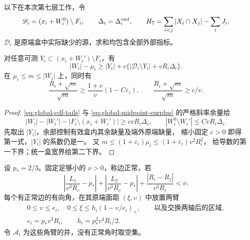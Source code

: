 以下在本次第七层工作，令
\[
 \mathscr D_i=(x_i+W_i^0)\setminus F_i,\qquad
 \Delta_i=\Delta_i^{\rm end},\qquad
 H_7=\sum_{i<j}|X_i\cap X_j|-\sum_iJ_i.
\]
\(\mathscr D_i\) 是原端盒中实际缺少的源，求和均包含全部外部指标。

\begin{lemma}[系数一及正剩余]\label{planar:cdf-reserve}
对任意可测 \(Y_i\subset(x_i+W_i')\setminus F_i\)，有
\begin{equation}\label{planar:missing-reserve}
 |W_i|-\mu_i\ge |Y_i|+
 c\{ |\mathscr D_i\setminus Y_i|+vR_i\Delta_i\}.
\end{equation}
在 \(\mu_i\le m\le|W_i|\) 上，同时有
\begin{equation}\label{planar:volume-derivative}
 \frac{R_i+\sqrt m}{\sqrt m}\ge
 \frac{1+v}{v}(1-C\varepsilon_i),\qquad
 \frac{R_i+\sqrt m}{\sqrt m}\ge c/v.
\end{equation}
\end{lemma}
\begin{proof}
\eqref{eq:global-cdf-tails} 与 \eqref{eq:global-midpoint-surplus} 的严格斜率余量给
\[
 |W_i|-|W_i'|-|F_i\setminus(x_i+W_i')|\ge c vR_i\Delta_i,
 \qquad |W_i^0\setminus W_i'|\le CvR_i\Delta_i.
\]
先取出 \(|Y_i|\)，余部控制有效盒内其余缺量及端外原端缺量，
缩小固定 \(c>0\) 即得第一式，\(|Y_i|\) 的系数仍是一。
又 \(m\le(1+\varepsilon_i)\mu_i\le(1+\varepsilon_i)v^2R_i^2\)，
给导数的第一下界；统一盒宽界给第二下界。
\end{proof}

设 \(p_*=2/3\)。固定足够小的 \(\nu>0\)，称边正常，若
\[
 \left|\frac{L_1}{v^3R_e}-p_*\right|
 +\left|\frac{L_2}{v^3R_e}-p_*\right|
 +\frac{|R_i-R_j|}{v^3R_e}<\nu.
\]
每个有正常边的有向角，在其原端面距 \((\xi,\upsilon)\) 中放置两臂
\begin{equation}\label{planar:arms}
 \begin{gathered}
 0\le\upsilon\le e_i,\quad
 0\le\xi\le h_i(1-\upsilon/e_i)_+,
 \qquad\text{以及交换两轴后的区域},\\
 e_i=p_*v^3R_i,\qquad h_i=p_*^2v^4R_i/2.
 \end{gathered}
\end{equation}
令 \(\mathcal A_i\) 为这些角臂的并，没有正常角时取空集。

